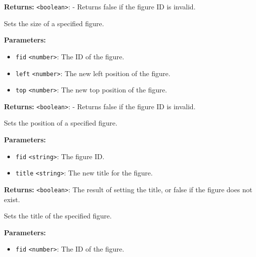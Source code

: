 \documentclass[12pt,a4paper]{article}
\begin{document}
\noindent \textbf{Returns:} \texttt{<boolean>}: - Returns false if the figure ID is invalid.

\noindent Sets the size of a specified figure.

\vspace{5mm}
\noindent {}


\noindent \textbf{Parameters:}
\begin{itemize}
  \item \texttt{fid} \texttt{<number>}: The ID of the figure.
  \item \texttt{left} \texttt{<number>}: The new left position of the figure.
  \item \texttt{top} \texttt{<number>}: The new top position of the figure.
\end{itemize}

\noindent \textbf{Returns:} \texttt{<boolean>}: - Returns false if the figure ID is invalid.

\noindent Sets the position of a specified figure.

\vspace{5mm}
\noindent {}


\noindent \textbf{Parameters:}
\begin{itemize}
  \item \texttt{fid} \texttt{<string>}: The figure ID.
  \item \texttt{title} \texttt{<string>}: The new title for the figure.
\end{itemize}

\noindent \textbf{Returns:} \texttt{<boolean>}: The result of setting the title, or false if the figure does not exist.

\noindent Sets the title of the specified figure.

\vspace{5mm}
\noindent {}


\noindent \textbf{Parameters:}
\begin{itemize}
  \item \texttt{fid} \texttt{<number>}: The ID of the figure.
\end{itemize}
\end{document}
